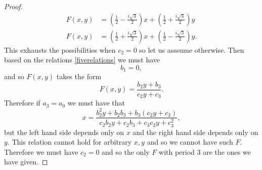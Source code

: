 \documentclass[12pt]{article}
\begin{document}
\begin{proof}
\begin{align*}
F(x,y) &= \left( \frac{1}{2} -\frac{i\sqrt{3}}{2} \right) x + \left( \frac{1}{2} +\frac{i\sqrt{3}}{2} \right) y \\
F(x,y) &= \left( \frac{1}{2} +\frac{i\sqrt{3}}{2} \right) x + \left( \frac{1}{2} -\frac{i\sqrt{3}}{2} \right) y.
\end{align*}
This exhausts the possibilities when $c_2=0$ so let us asssume otherwise. Then based on the relations \ref{fiverelations} we must have 
\begin{equation*}
b_1 = 0,
\end{equation*}
and so $F(x,y)$ takes the form 
\begin{equation*}
F(x,y) = \frac{b_2 y + b_3}{c_2 y + c_3}.
\end{equation*}
Therefore if $a_3 = a_0$ we must have that 
\begin{equation*}
x = \frac{ b_2^2 y + b_2b_3 +b_3(c_2 y + c_3)}{c_2 b_2 y + c_2 b_3 + c_3 c_2 y + c_3^2},
\end{equation*}
but the left hand side depends only on $x$ and the right hand side depends only on $y$. This relation cannot hold for arbitrary $x,y$ and so we cannot have such $F$. Therefore we must have $c_2=0$ and so the only $F$ with period 3 are the ones we have given. 
\end{proof}
\end{document}
